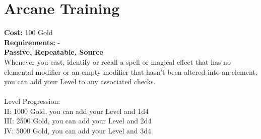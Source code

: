 \section{Arcane Training}
\textbf{Cost:} 100 Gold\\
\textbf{Requirements:} -\\
\textbf{Passive, Repeatable, Source}\\
Whenever you cast, identify or recall a spell or magical effect that has no elemental modifier or an empty modifier that hasn't been altered into an element, you can add your Level to any associated checks.\\
\\
Level Progression:\\
II: 1000 Gold, you can add your Level and 1d4\\
III: 2500 Gold, you can add your Level and 2d4\\
IV: 5000 Gold, you can add your Level and 3d4\\